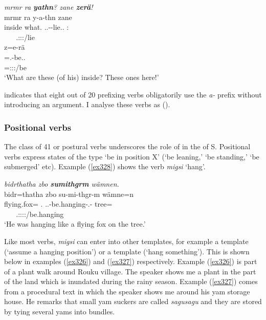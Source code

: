 \begin{exe}
	\ex \emph{mrmr ra \textbf{yathn}? zane \textbf{zerä}!}\\
	\glll mrmr ra y-a-thn zane\\
	inside what.\Abs{} \Tsg.\Masc.\Alph-\Vc-lie.\Ext.\Ndu{} \Dem:\Prox{}\\
	~ ~ {\footnotesize \Tsg.\Masc:\Io:\Nonpast:\Ipfv/lie} ~\\
	\sn
	\glll z=e-rä\\
	\Prox=\Stnsg.\Alph-be.\Ext.\Ndu\\
	{\footnotesize \Prox=\Stpl:\Sbj:\Nonpast:\Ipfv/be}\\
	\trans `What are these (of his) inside? These ones here!' 
	\label{ex160}
\end{exe}

 indicates that eight out of 20 prefixing verbs obligatorily use the \emph{a-} prefix without introducing an argument. I analyse these verbs as  (\citealt{Baerman:2006depo}).

\subsubsection{Positional verbs} \label{positionalverbs}

The class of 41  or postural verbs underscores the role of  in the  of S. Positional verbs express states of the type `be in position X' (`be leaning,' `be standing,' `be submerged' etc). Example (\ref{ex328}) shows the verb \emph{migsi} `hang'.%

\begin{exe}
	\ex \emph{bidrthatha zbo \textbf{sumithgrm} wämnen.}\\
	\glll bidr=thatha zbo su-mi-thgr-m wämne=n\\
	{{flying.fox}=\Simil{}} {\Prox.\All{}} \Tsg.\Masc.\Betaone{}-be.hanging-\Stat.\Ndu-\Dur{} tree=\Loc\\
	~ ~ {\Tsg.\Masc:\Sbj:\Pst:\Dur:\Stat/be.hanging} ~\\
	\trans `He was hanging like a flying fox on the tree.' 
	\label{ex328}
\end{exe}

Like most  verbs, \emph{migsi} can enter into other templates, for example a  template (`assume a hanging position') or a  template (`hang something'). This is shown below in examples (\ref{ex326}) and (\ref{ex327}) respectively. Example (\ref{ex326}) is part of a plant walk around Rouku village. The speaker shows me a plant in the part of the land which is inundated during the rainy season. Example (\ref{ex327}) comes from a procedural text in which the speaker shows me around his yam storage house. He remarks that small yam suckers are called \emph{sagusagu} and they are stored by tying several yams into bundles.%

